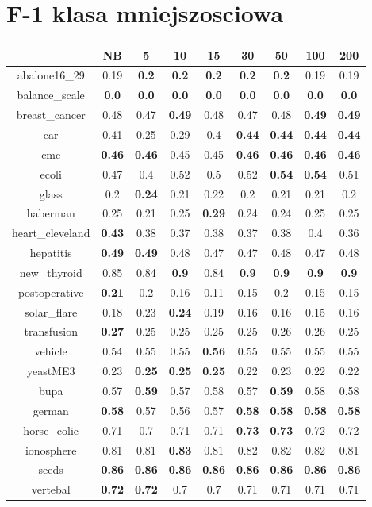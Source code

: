 \documentclass{article}%
\begin{document}
%
\section*{F{-}1 klasa mniejszosciowa}%
\begin{tabular}{c|cccccccc}%
\hline%
&NB&5&10&15&30&50&100&200\\%
\hline%
abalone16\_29&0.19&\textbf{0.2}&\textbf{0.2}&\textbf{0.2}&\textbf{0.2}&\textbf{0.2}&0.19&0.19\\%
\hline%
balance\_scale&\textbf{0.0}&\textbf{0.0}&\textbf{0.0}&\textbf{0.0}&\textbf{0.0}&\textbf{0.0}&\textbf{0.0}&\textbf{0.0}\\%
\hline%
breast\_cancer&0.48&0.47&\textbf{0.49}&0.48&0.47&0.48&\textbf{0.49}&\textbf{0.49}\\%
\hline%
car&0.41&0.25&0.29&0.4&\textbf{0.44}&\textbf{0.44}&\textbf{0.44}&\textbf{0.44}\\%
\hline%
cmc&\textbf{0.46}&\textbf{0.46}&0.45&0.45&\textbf{0.46}&\textbf{0.46}&\textbf{0.46}&\textbf{0.46}\\%
\hline%
ecoli&0.47&0.4&0.52&0.5&0.52&\textbf{0.54}&\textbf{0.54}&0.51\\%
\hline%
glass&0.2&\textbf{0.24}&0.21&0.22&0.2&0.21&0.21&0.2\\%
\hline%
haberman&0.25&0.21&0.25&\textbf{0.29}&0.24&0.24&0.25&0.25\\%
\hline%
heart\_cleveland&\textbf{0.43}&0.38&0.37&0.38&0.37&0.38&0.4&0.36\\%
\hline%
hepatitis&\textbf{0.49}&\textbf{0.49}&0.48&0.47&0.47&0.48&0.47&0.48\\%
\hline%
new\_thyroid&0.85&0.84&\textbf{0.9}&0.84&\textbf{0.9}&\textbf{0.9}&\textbf{0.9}&\textbf{0.9}\\%
\hline%
postoperative&\textbf{0.21}&0.2&0.16&0.11&0.15&0.2&0.15&0.15\\%
\hline%
solar\_flare&0.18&0.23&\textbf{0.24}&0.19&0.16&0.16&0.15&0.16\\%
\hline%
transfusion&\textbf{0.27}&0.25&0.25&0.25&0.25&0.26&0.26&0.25\\%
\hline%
vehicle&0.54&0.55&0.55&\textbf{0.56}&0.55&0.55&0.55&0.55\\%
\hline%
yeastME3&0.23&\textbf{0.25}&\textbf{0.25}&\textbf{0.25}&0.22&0.23&0.22&0.22\\%
\hline%
bupa&0.57&\textbf{0.59}&0.57&0.58&0.57&\textbf{0.59}&0.58&0.58\\%
\hline%
german&\textbf{0.58}&0.57&0.56&0.57&\textbf{0.58}&\textbf{0.58}&\textbf{0.58}&\textbf{0.58}\\%
\hline%
horse\_colic&0.71&0.7&0.71&0.71&\textbf{0.73}&\textbf{0.73}&0.72&0.72\\%
\hline%
ionosphere&0.81&0.81&\textbf{0.83}&0.81&0.82&0.82&0.82&0.81\\%
\hline%
seeds&\textbf{0.86}&\textbf{0.86}&\textbf{0.86}&\textbf{0.86}&\textbf{0.86}&\textbf{0.86}&\textbf{0.86}&\textbf{0.86}\\%
\hline%
vertebal&\textbf{0.72}&\textbf{0.72}&0.7&0.7&0.71&0.71&0.71&0.71\\%
\hline%
\end{tabular}
\end{document}
